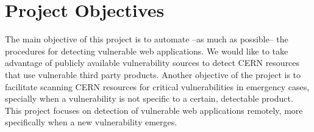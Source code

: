 \section{Project Objectives}
The main objective of this project is to automate --as much as possible-- the procedures for detecting vulnerable web applications. We would like to take advantage of publicly available vulnerability sources to detect CERN resources that use vulnerable third party products. Another objective of the project is to facilitate scanning CERN resources for critical vulnerabilities in emergency cases, specially when a vulnerability is not specific to a certain, detectable product. This project focuses on detection of vulnerable web applications remotely, more specifically when a new vulnerability emerges.

























